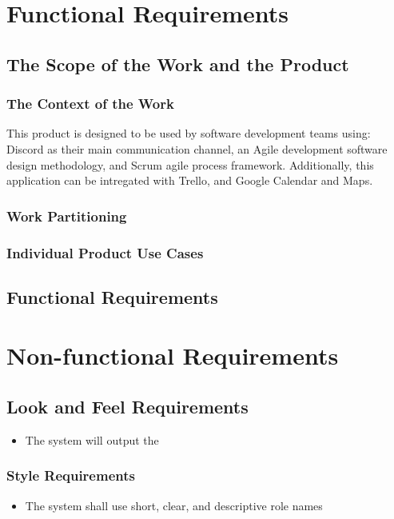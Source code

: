 \documentclass[12pt, titlepage]{article}
\begin{document}
\section{Functional Requirements}

\subsection{The Scope of the Work and the Product}

\subsubsection{The Context of the Work}
This product is designed to be used by software development teams using: Discord as their main communication channel, an Agile development software design methodology, and Scrum agile process framework. Additionally, this application can be intregated with Trello, and Google Calendar and Maps.

\subsubsection{Work Partitioning}

\subsubsection{Individual Product Use Cases}

\subsection{Functional Requirements}

\section{Non-functional Requirements}

\subsection{Look and Feel Requirements}
\begin{itemize}
    \item The system will output the 
\end{itemize}

\subsubsection{Style Requirements}
\begin{itemize}
    \item The system shall use short, clear, and descriptive role names
\end{itemize}
\end{document}
